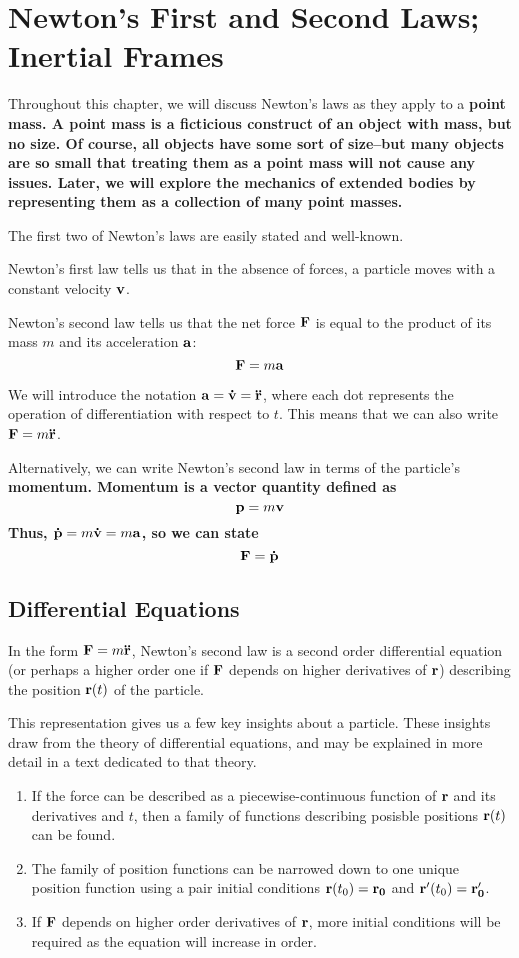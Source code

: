 \section{Newton's First and Second Laws; Inertial Frames}
Throughout this chapter, we will discuss Newton's laws as they apply to a \bf{point mass}. A point mass is a ficticious construct of an object with mass, but no size. Of course, all objects have some sort of size--but many objects are so small that treating them as a point mass will not cause any issues. Later, we will explore the mechanics of extended bodies by representing them as a collection of many point masses.

The first two of Newton's laws are easily stated and well-known.

\begin{theorem}
    Newton's first law tells us that in the absence of forces, a particle moves with a constant velocity $\mathbf{v}$.
\end{theorem}
\begin{theorem}
    Newton's second law tells us that the net force $\mathbf{F}$ is equal to the product of its mass $m$ and its acceleration $\mathbf{a}$:
    \[ \mathbf{F} = m\mathbf{a} \]
\end{theorem}
We will introduce the notation $\mathbf{a} = \mathbf{\dot v} =  \mathbf{\ddot{r}}$, where each dot represents the operation of differentiation with respect to $t$. This means that we can also write $\mathbf{F} = m\mathbf{\ddot{r}}$.

Alternatively, we can write Newton's second law in terms of the particle's \bf{momentum}. Momentum is a vector quantity defined as
\[ \mathbf{p} = m\mathbf{v} \]
Thus, $\mathbf{\dot p} = m\mathbf{\dot v} = m\mathbf{a}$, so we can state
\[ \mathbf{F} = \mathbf{\dot p} \]
\subsection*{Differential Equations}
In the form $\mathbf{F} = m\mathbf{\ddot r}$, Newton's second law is a second order differential equation (or perhaps a higher order one if $\mathbf{F}$ depends on higher derivatives of $\mathbf{r}$) describing the position $\mathbf{r}(t)$ of the particle. 

This representation gives us a few key insights about a particle. These insights draw from the theory of differential equations, and may be explained in more detail in a text dedicated to that theory.

\begin{enumerate}
    \item If the force can be described as a piecewise-continuous function of $\mathbf{r}$ and its derivatives and $t$, then a family of functions describing posisble positions $\mathbf{r}(t)$ can be found.
    \item The family of position functions can be narrowed down to one unique position function using a pair initial conditions $\mathbf{r}(t_0) = \mathbf{r_0}$ and $\mathbf{r}'(t_0) = \mathbf{r_0'}$.
    \item If $\mathbf{F}$ depends on higher order derivatives of $\mathbf{r}$, more initial conditions will be required as the equation will increase in order.
\end{enumerate}


